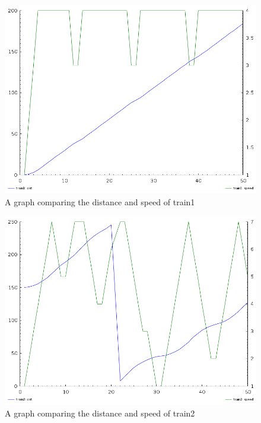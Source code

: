 \begin{figure}
\begin{center}
\includegraphics[scale=0.4]{t1graph.png}
\end{center}
\caption{A graph comparing the distance and speed of train1}
\end{figure}

\begin{figure}
\begin{center}
\includegraphics[scale=0.4]{t2graph.png}
\end{center}
\caption{A graph comparing the distance and speed of train2}
\end{figure}

